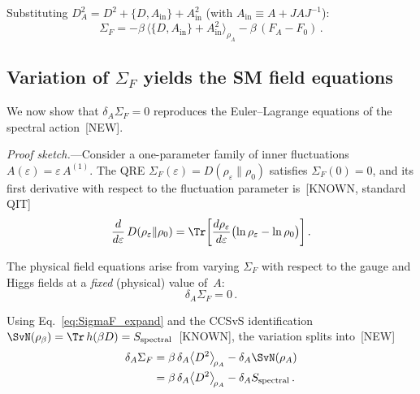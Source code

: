 Substituting
$D_A^2 = D^2 + \{D,A_{\mathrm{in}}\}
+ A_{\mathrm{in}}^2$
(with $A_{\mathrm{in}} \equiv A + JAJ^{-1}$):
\begin{equation}\label{eq:SigmaF_inner}
  \Sigma_F
  = -\beta\,\bigl\langle
    \{D,A_{\mathrm{in}}\}
    + A_{\mathrm{in}}^2
  \bigr\rangle_{\!\rho_A}
  - \beta\,(F_A - F_0)\,.
\end{equation}


\subsection{Variation of $\Sigma_F$ yields
the SM field equations}
\label{sec:variation}

We now show that
$\delta_A \Sigma_F = 0$ reproduces the
Euler--Lagrange equations of the
spectral action~[NEW].

\emph{Proof sketch.}---Consider a
one-parameter family of inner fluctuations
$A(\varepsilon) = \varepsilon\, A^{(1)}$.
The QRE $\Sigma_F(\varepsilon) = D(\rho_\varepsilon \| \rho_0)$
satisfies $\Sigma_F(0) = 0$, and
its first derivative with respect to the
fluctuation parameter is~[KNOWN, standard QIT]
\begin{equation}\label{eq:first_var}
  \frac{d}{d\varepsilon}\,
  D(\rho_\varepsilon \| \rho_0)
  = \Tr\!\left[
    \frac{d\rho_\varepsilon}{d\varepsilon}
    \bigl(\ln\rho_\varepsilon - \ln\rho_0\bigr)
  \right].
\end{equation}

The physical field equations arise from varying
$\Sigma_F$ with respect to the gauge and Higgs
fields at a \emph{fixed} (physical) value
of~$A$:
\begin{equation}\label{eq:variation_principle}
  \delta_A \Sigma_F = 0\,.
\end{equation}

Using Eq.~\eqref{eq:SigmaF_expand} and
the CCSvS identification~\cite{CCSvS2018}
$\SvN(\rho_\beta) = \Tr\, h(\beta D)
= S_{\mathrm{spectral}}$~[KNOWN],
the variation splits into~[NEW]
\begin{align}\label{eq:var_split}
  \delta_A \Sigma_F
  &= \beta\,\delta_A
    \bigl\langle D^2 \bigr\rangle_{\!\rho_A}
  - \delta_A \SvN(\rho_A)
  \nonumber\\
  &= \beta\,\delta_A
    \bigl\langle D^2 \bigr\rangle_{\!\rho_A}
  - \delta_A S_{\mathrm{spectral}}\,.
\end{align}

